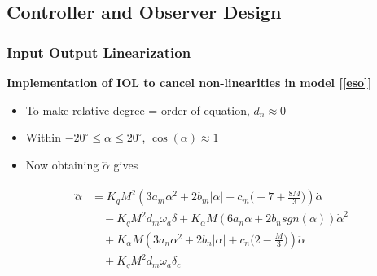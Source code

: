 \documentclass[table,10pt,red]{beamer}	%
\begin{document}
\subsection{Controller and Observer Design} %
\begin{frame}
	\frametitle{Input Output Linearization}
	\textbf{Implementation of IOL to cancel non-linearities in model [\ref{eso}]} 
	\begin{itemize}
		\item To make relative degree = order of equation, $d_n \approx 0$
		\item Within $-20^\circ\le \alpha \le20^\circ$, $\cos(\alpha) \approx 1$
		\item Now obtaining $\dddot{\alpha}$ gives
	\end{itemize}

\begin{eqnarray*}
\begin{aligned}
	\dddot{\alpha}&=K_q M^2(3a_m\alpha^2+2b_m|\alpha|+c_m\Big(-7+\frac{8M}{3}\Big))\dot{\alpha}\\ 
	&\quad - K_q M^2d_m\omega_a\delta+K_{\alpha}M(6a_n\alpha+2b_n sgn(\alpha))\dot{\alpha}^2\\ 
	&\quad + K_\alpha M(3a_n\alpha^2+2b_n|\alpha|+c_n\Big(2-\frac{M}{3}\Big))\ddot{\alpha}\\ 
	&\quad + K_q M^2d_m\omega_a\delta_c \label{a3dot}
\end{aligned}
\label{eq4}
\end{eqnarray*}

\end{frame}
\end{document}

